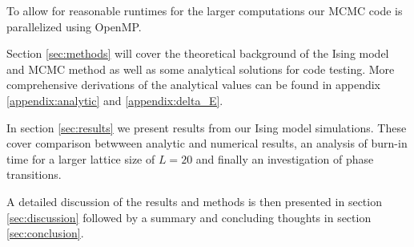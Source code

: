 \documentclass[english,notitlepage,reprint,nofootinbib]{revtex4-1}  %
\begin{document}
To allow for reasonable runtimes for the larger computations our MCMC code is parallelized using OpenMP.

Section \ref{sec:methods} will cover the theoretical background of the Ising model and MCMC method as well as some analytical solutions for code testing. More comprehensive derivations of the analytical values can be found in appendix \ref{appendix:analytic} and \ref{appendix:delta_E}.

In section \ref{sec:results} we present results from our Ising model simulations. These cover comparison betwween analytic and numerical results, an analysis of burn-in time for a larger lattice size of $L = 20$ and finally an investigation of phase transitions.

A detailed discussion of the results and methods is then presented in section \ref{sec:discussion} followed by a summary and concluding thoughts in section \ref{sec:conclusion}.

\end{document}
